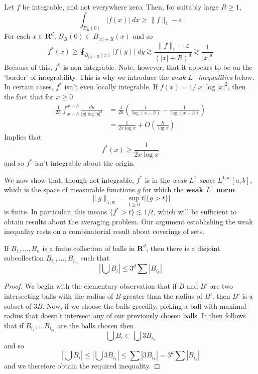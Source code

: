 \begin{example}
  Let $f$ be integrable, and not everywhere zero. Then, for suitably large $R \geq 1$,
  \[ \int_{B_R(0)} |f(x)|\; dx \geq \| f \|_1 - \varepsilon \]
  For each $x \in \mathbf{R}^d$, $B_R(0) \subset B_{|x|+R}(x)$ and so
  \[ f^*(x) \geq \fint_{B_{|x|+R}(x)} |f(y)|\; dy \gtrsim \frac{\|f \|_1 - \varepsilon}{(|x| + R)^d} \gtrsim \frac{1}{|x|^d} \]
  Because of this, $f^*$ is non-integrable. Note, however, that it appears to be on the `border' of integrability. This is why we introduce the {\it weak $L^1$ inequalities} below. In certain cases, $f^*$ isn't even locally integrable. If $f(x) = 1/|x| \log|x|^2$, then the fact that for $x \geq 0$
  \begin{align*}
    \frac{1}{2h} \int_{x-h}^{x+h} \frac{dy}{|y| \log |y|^2} &= \frac{1}{2h} \left( \frac{1}{\log(x-h)} - \frac{1}{\log(x+h)} \right)\\
    &= \frac{1}{2x \log x} + O \left( \frac{h}{\log x} \right)
  \end{align*}
  Implies that
  \[ f^*(x) \geq \frac{1}{2x \log x} \]
  and so $f^*$ isn't integrable about the origin.
\end{example}

We now show that, though not integrable, $f^*$ is in the {\it weak $L^1$ space} $L^{1,w}[a,b]$, which is the space of measurable functions $g$ for which the {\bf weak $L^1$ norm}
%
\[ \| g \|_{1,w} = \sup_{t \geq 0} t |\{ g > t \}| \]
%
is finite. In particular, this means $\{ f^* > t \} \lesssim 1/t$, which will be sufficient to obtain results about the averaging problem. Our argument establishing the weak inequality rests on a combinatorial result about coverings of sets.

\begin{lemma}
    If $B_1, \dots, B_n$ is a finite collection of balls in $\mathbf{R}^d$, then there is a disjoint subcollection $B_{i_1}, \dots, B_{i_m}$ such that
    \[ \left| \bigcup B_i \right| \leq 3^d \sum |B_{i_k}| \]
\end{lemma}
\begin{proof}
    We begin with the elementary observation that if $B$ and $B'$ are two intersecting balls with the radius of $B$ greater than the radius of $B'$, then $B'$ is a subset of $3B$. Now, if we choose the balls greedily, picking a ball with maximal radius that doesn't intersect any of our previously chosen balls. It then follows that if $B_{i_1}, \dots B_{i_m}$ are the balls chosen then
    \[ \bigcup B_i \subset \bigcup 3B_{i_k} \]
    and so
    \[ \left| \bigcup B_i \right| \leq \left| \bigcup 3B_{i_k} \right| \leq \sum |3B_{i_k}| = 3^d \sum |B_{i_k}| \]
    and we therefore obtain the required inequality.
\end{proof}

